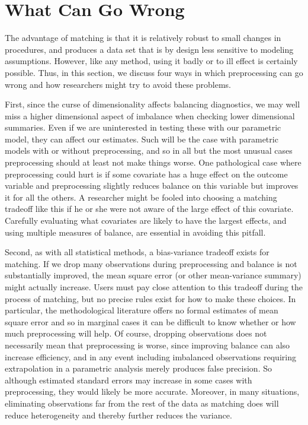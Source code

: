 \documentclass[11pt,titlepage]{article}
\begin{document}
\section{What Can Go Wrong}

The advantage of matching is that it is relatively robust to small
changes in procedures, and produces a data set that is by design less
sensitive to modeling assumptions.  However, like any method, using it
badly or to ill effect is certainly possible.  Thus, in this section,
we discuss four ways in which preprocessing can go wrong and how
researchers might try to avoid these problems.

First, since the curse of dimensionality affects balancing
diagnostics, we may well miss a higher dimensional aspect of imbalance
when checking lower dimensional summaries.  Even if we are
uninterested in testing these with our parametric model, they can
affect our estimates.  Such will be the case with parametric models
with or without preprocessing, and so in all but the most unusual
cases preprocessing should at least not make things worse.  One
pathological case where preprocessing could hurt is if some covariate
has a huge effect on the outcome variable and preprocessing slightly
reduces balance on this variable but improves it for all the others.
A researcher might be fooled into choosing a matching tradeoff like
this if he or she were not aware of the large effect of this
covariate.  Carefully evaluating what covariates are likely to have
the largest effects, and using multiple measures of balance, are
essential in avoiding this pitfall.

Second, as with all statistical methods, a bias-variance tradeoff
exists for matching.  If we drop many observations during
preprocessing and balance is not substantially improved, the mean
square error (or other mean-variance summary) might actually increase.
Users must pay close attention to this tradeoff during the process of
matching, but no precise rules exist for how to make these choices.
In particular, the methodological literature offers no formal
estimates of mean square error and so in marginal cases it can be
difficult to know whether or how much preprocessing will help.  Of
course, dropping observations does not necessarily mean that
preprocessing is worse, since improving balance can also increase
efficiency, and in any event including imbalanced observations
requiring extrapolation in a parametric analysis merely produces false
precision.  So although estimated standard errors may increase in some
cases with preprocessing, they would likely be more accurate.
Moreover, in many situations, eliminating observations far from the
rest of the data as matching does will reduce heterogeneity and
thereby further reduces the variance.
\end{document}
